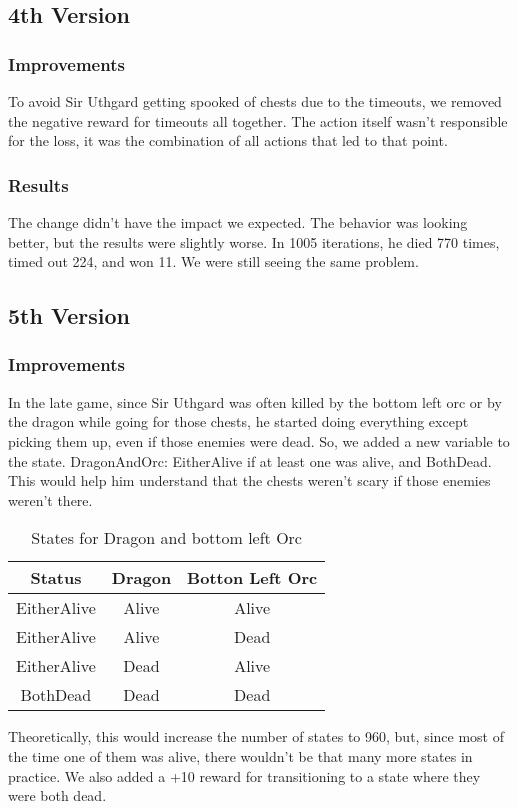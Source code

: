\documentclass{article}
\begin{document}
  \subsection{4th Version}

  \subsubsection{Improvements}

  To avoid Sir Uthgard getting spooked of chests due to the timeouts, we removed the negative reward for timeouts all together. The action itself wasn't responsible for the loss, it was the combination of all actions that led to that point.  
  
  \subsubsection{Results}

  The change didn't have the impact we expected. The behavior was looking better, but the results were slightly worse. In 1005 iterations, he died 770 times, timed out 224, and won 11. We were still seeing the same problem.

  \subsection{5th Version}

  \subsubsection{Improvements}
  
  In the late game, since Sir Uthgard was often killed by the bottom left orc or by the dragon while going for those chests, he started doing everything except picking them up, even if those enemies were dead.
  So, we added a new variable to the state. DragonAndOrc: EitherAlive if at least one was alive, and BothDead. This would help him understand that the chests weren't scary if those enemies weren't there. 

  \begin{table}[h!]
    \centering
    \caption{States for Dragon and bottom left Orc}
    \label{tab:tableA*7}
    \begin{tabular}{c|c|c}
      \textbf{Status} & \textbf{Dragon} & \textbf{Botton Left Orc}\\
      \hline
      EitherAlive & Alive & Alive\\
      EitherAlive & Alive & Dead\\
      EitherAlive & Dead & Alive\\
      BothDead & Dead & Dead\\
    \end{tabular}
  \end{table}
  \noindent
  Theoretically, this would increase the number of states to 960, but, since most of the time one of them was alive, there wouldn't be that many more states in practice. 
  We also added a +10 reward for transitioning to a state where they were both dead.
\end{document}
